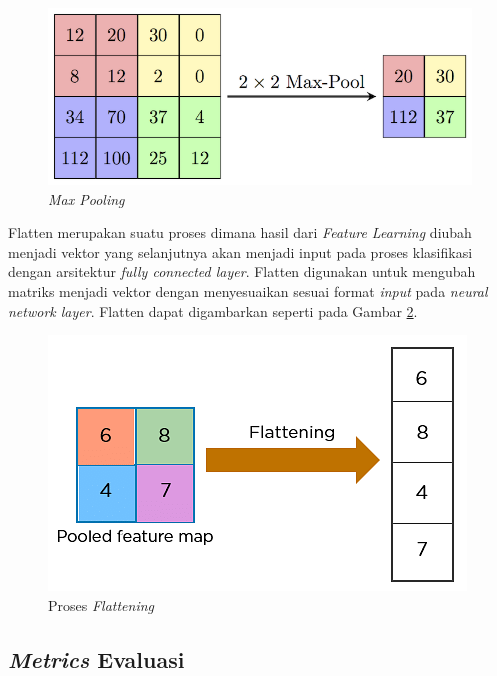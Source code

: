 \begin{figure} [ht] \centering
    \includegraphics[scale=1.5]{gambar/maxPooling.png}
    \caption{\emph{Max Pooling}}
    \label{fig:Max Pooling}
\end{figure}

Flatten merupakan suatu proses dimana hasil dari \emph{Feature Learning} diubah menjadi vektor yang selanjutnya akan menjadi input pada proses klasifikasi dengan arsitektur \emph{fully connected layer}. Flatten digunakan untuk mengubah matriks menjadi vektor dengan menyesuaikan sesuai format \emph{input} pada \emph{neural network layer}. Flatten dapat digambarkan seperti pada Gambar \ref{fig:Proses Flattening}.

\begin{figure} [ht] \centering
    \includegraphics[scale=0.6]{gambar/flattening.png}
    \caption{Proses \emph{Flattening}}
    \label{fig:Proses Flattening}
\end{figure}

\subsection{\emph{Metrics} Evaluasi}

